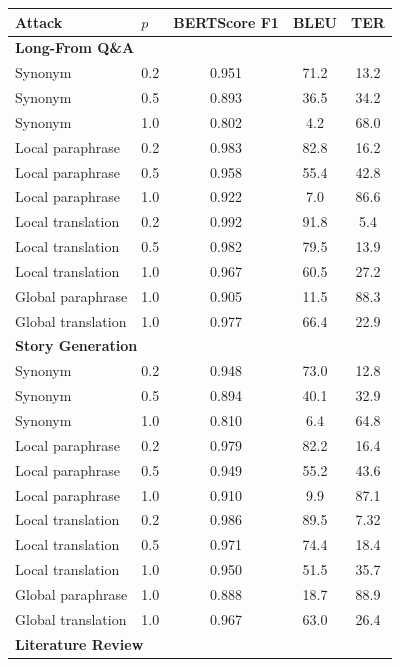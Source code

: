\begin{table}
\centering
\small
\setlength{\tabcolsep}{5pt}
\renewcommand{\arraystretch}{1.05}
\begin{tabular}{llccc}
\toprule
Attack & $p$ & BERTScore F1 & BLEU & TER \\
\midrule
\multicolumn{5}{l}{\textbf{Long-From Q\&A}} \\
Synonym                 & 0.2 & 0.951 & 71.2 & 13.2 \\
Synonym                 & 0.5 & 0.893 & 36.5 & 34.2 \\
Synonym                 & 1.0 & 0.802 &  4.2 & 68.0 \\
Local paraphrase        & 0.2 & 0.983 & 82.8 & 16.2 \\
Local paraphrase        & 0.5 & 0.958 & 55.4 & 42.8 \\
Local paraphrase        & 1.0 & 0.922 &  7.0 & 86.6 \\
Local translation  & 0.2 & 0.992 & 91.8 &  5.4 \\
Local translation  & 0.5 & 0.982 & 79.5 & 13.9 \\
Local translation  & 1.0 & 0.967 & 60.5 & 27.2 \\
Global paraphrase       & 1.0 & 0.905 & 11.5 & 88.3 \\
Global translation & 1.0 & 0.977 & 66.4 & 22.9 \\
\midrule
\multicolumn{5}{l}{\textbf{Story Generation}} \\
Synonym                 & 0.2 & 0.948 & 73.0 & 12.8 \\
Synonym                 & 0.5 & 0.894 & 40.1 & 32.9 \\
Synonym                 & 1.0 & 0.810 &  6.4 & 64.8 \\
Local paraphrase        & 0.2 & 0.979 & 82.2 & 16.4 \\
Local paraphrase        & 0.5 & 0.949 & 55.2 & 43.6 \\
Local paraphrase        & 1.0 & 0.910 &  9.9 & 87.1 \\
Local translation       & 0.2 & 0.986 & 89.5 & 7.32 \\
Local translation       & 0.5 & 0.971 & 74.4 & 18.4 \\
Local translation       & 1.0 & 0.950 & 51.5 & 35.7\\
Global paraphrase       & 1.0 & 0.888 & 18.7 & 88.9 \\
Global translation      & 1.0 & 0.967 & 63.0 & 26.4 \\
\midrule
\multicolumn{5}{l}{\textbf{Literature Review}} \\

\end{tabular}
\end{table}
